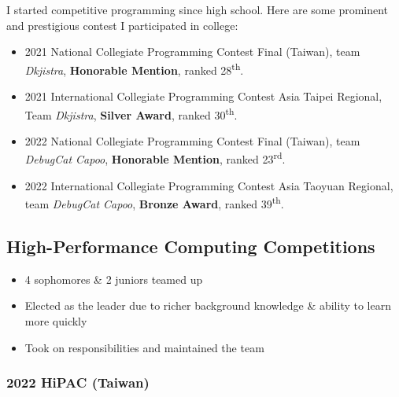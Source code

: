 \documentclass[12pt, a4paper]{article}
\begin{document}
I started competitive programming since high school. Here are some prominent and prestigious contest I participated in college:

\begin{itemize}
\item 2021 National Collegiate Programming Contest Final (Taiwan), team \emph{Dkjistra}, \textbf{Honorable Mention}, ranked 28\textsuperscript{th}.
\item 2021 International Collegiate Programming Contest Asia Taipei Regional, Team \emph{Dkjistra}, \textbf{Silver Award}, ranked 30\textsuperscript{th}.
\item 2022 National Collegiate Programming Contest Final (Taiwan), team \emph{DebugCat Capoo}, \textbf{Honorable Mention}, ranked 23\textsuperscript{rd}.
\item 2022 International Collegiate Programming Contest Asia Taoyuan Regional, team \emph{DebugCat Capoo}, \textbf{Bronze Award}, ranked 39\textsuperscript{th}.
\end{itemize}

\subsection{High-Performance Computing Competitions}


\begin{itemize}
\item 4 sophomores \& 2 juniors teamed up
\item Elected as the leader due to richer background knowledge \& ability to learn more quickly
\item Took on responsibilities and maintained the team
\end{itemize}

\subsubsection{2022 HiPAC (Taiwan)}

\end{document}
